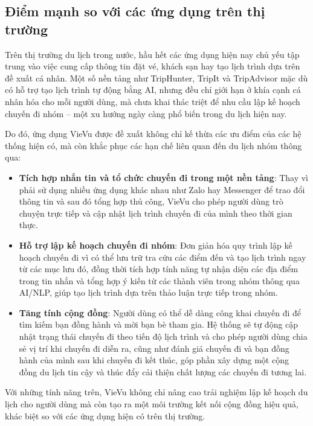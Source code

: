 \subsection{Điểm mạnh so với các ứng dụng trên thị trường}

Trên thị trường du lịch trong nước, hầu hết các ứng dụng hiện nay chủ yếu tập trung vào việc cung cấp thông tin đặt vé, khách sạn hay tạo lịch trình dựa trên đề xuất cá nhân. Một số nền tảng như TripHunter, TripIt và TripAdvisor mặc dù có hỗ trợ tạo lịch trình tự động bằng AI, nhưng đều chỉ giới hạn ở khía cạnh cá nhân hóa cho mỗi người dùng, mà chưa khai thác triệt để nhu cầu lập kế hoạch chuyến đi nhóm – một xu hướng ngày càng phổ biến trong du lịch hiện nay.

Do đó, ứng dụng VieVu được đề xuất không chỉ kế thừa các ưu điểm của các hệ thống hiện có, mà còn khắc phục các hạn chế liên quan đến du lịch nhóm thông qua:
\begin{itemize}
  \item \textbf{Tích hợp nhắn tin và tổ chức chuyến đi trong một nền tảng}: Thay vì phải sử dụng nhiều ứng dụng khác nhau như Zalo hay Messenger để trao đổi thông tin và sau đó tổng hợp thủ công, VieVu cho phép người dùng trò chuyện trực tiếp và cập nhật lịch trình chuyến đi của mình theo thời gian thực.

  \item \textbf{Hỗ trợ lập kế hoạch chuyến đi nhóm}: Đơn giản hóa quy trình lập kế hoạch chuyến đi vì có thể lưu trữ tra cứu các điểm đến và tạo lịch trình ngay từ các mục lưu đó, đồng thời tích hợp tính năng tự nhận diện các địa điểm trong tin nhắn và tổng hợp ý kiến từ các thành viên trong nhóm thông qua AI/NLP, giúp tạo lịch trình dựa trên thảo luận trực tiếp trong nhóm.

  \item \textbf{Tăng tính cộng đồng}: Người dùng có thể dễ dàng công khai chuyến đi để tìm kiếm bạn đồng hành và mời bạn bè tham gia. Hệ thống sẽ tự động cập nhật trạng thái chuyến đi theo tiến độ lịch trình và cho phép người dùng chia sẻ vị trí khi chuyến đi diễn ra, cũng như đánh giá chuyến đi và bạn đồng hành của mình sau khi chuyến đi kết thúc, góp phần xây dựng một cộng đồng du lịch tin cậy và thúc đẩy cải thiện chất lượng các chuyến đi tương lai.

\end{itemize}
Với những tính năng trên, VieVu không chỉ nâng cao trải nghiệm lập kế hoạch du lịch cho người dùng mà còn tạo ra một môi trường kết nối cộng đồng hiệu quả, khác biệt so với các ứng dụng hiện có trên thị trường.


